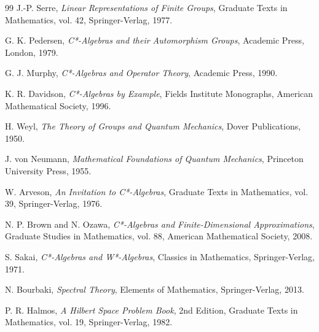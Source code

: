 \documentclass[12pt,a4paper]{ltjarticle}
\theoremstyle{definition}
\begin{document}
\begin{thebibliography}{99}
J.-P. Serre, \textit{Linear Representations of Finite Groups}, Graduate Texts in Mathematics, vol. 42, Springer-Verlag, 1977.

G. K. Pedersen, \textit{C*-Algebras and their Automorphism Groups}, Academic Press, London, 1979.

G. J. Murphy, \textit{C*-Algebras and Operator Theory}, Academic Press, 1990.

K. R. Davidson, \textit{C*-Algebras by Example}, Fields Institute Monographs, American Mathematical Society, 1996.

H. Weyl, \textit{The Theory of Groups and Quantum Mechanics}, Dover Publications, 1950.

J. von Neumann, \textit{Mathematical Foundations of Quantum Mechanics}, Princeton University Press, 1955.

W. Arveson, \textit{An Invitation to C*-Algebras}, Graduate Texts in Mathematics, vol. 39, Springer-Verlag, 1976.

N. P. Brown and N. Ozawa, \textit{C*-Algebras and Finite-Dimensional Approximations}, Graduate Studies in Mathematics, vol. 88, American Mathematical Society, 2008.

S. Sakai, \textit{C*-Algebras and W*-Algebras}, Classics in Mathematics, Springer-Verlag, 1971.

N. Bourbaki, \textit{Spectral Theory}, Elements of Mathematics, Springer-Verlag, 2013.

P. R. Halmos, \textit{A Hilbert Space Problem Book}, 2nd Edition, Graduate Texts in Mathematics, vol. 19, Springer-Verlag, 1982.

\end{thebibliography}
\end{document}
